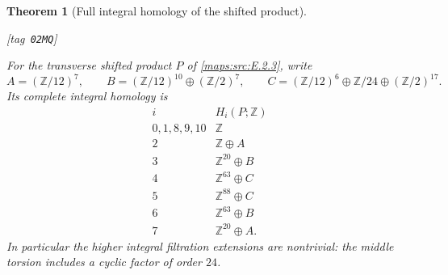 \documentclass[11pt,a4paper]{article}
\numberwithin{equation}{section}
\newtheorem{theorem}{Theorem}[section]
\theoremstyle{definition}
\newcommand{\StatementRecord}[4]{{\upshape\footnotesize[tag~\texttt{#3}]}\enspace\ignorespaces}
\begin{document}
\begin{theorem}[Full integral homology of the shifted product]\hypertarget{tag-02MQ}{}\label{maps:src:E.2.6}
\StatementRecord{maps:src:E.2.6}{proved}{02MQ}{\cref{maps:src:E.2.3}, \eqref{maps:eq:E.MV1}, \cref{maps:src:E.2.5}, \eqref{maps:eq:E.MV3}, \eqref{maps:eq:E.MV2}, \eqref{maps:eq:E.MV5}, \eqref{maps:eq:E.MV6}, \eqref{maps:eq:E.MV7}, \eqref{maps:eq:E.MV8}}


For the transverse shifted product $P$ of \ref{maps:src:E.2.3}, write
\[
 A=(\mathbb Z/12)^7,\qquad
 B=(\mathbb Z/12)^{10}\oplus(\mathbb Z/2)^7,\qquad
 C=(\mathbb Z/12)^6\oplus\mathbb Z/24\oplus(\mathbb Z/2)^{17}.
\]
Its complete integral homology is
\[
 \begin{array}{c|l}
 i&H_i(P;\mathbb Z)\\\hline
 0,1,8,9,10&\mathbb Z\\
 2&\mathbb Z\oplus A\\
 3&\mathbb Z^{20}\oplus B\\
 4&\mathbb Z^{63}\oplus C\\
 5&\mathbb Z^{88}\oplus C\\
 6&\mathbb Z^{63}\oplus B\\
 7&\mathbb Z^{20}\oplus A.
 \end{array}
\]
In particular the higher integral filtration extensions are nontrivial:
the middle torsion includes a cyclic factor of order $24$.
\end{theorem}
\end{document}
